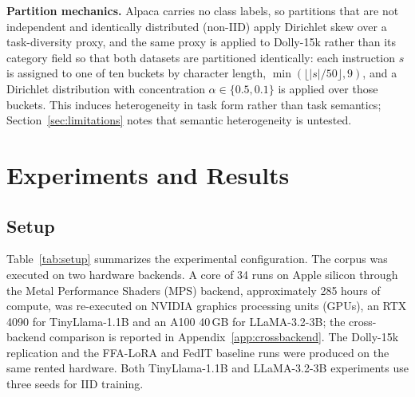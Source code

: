 \documentclass[iicol,pdflatex,sn-mathphys-num]{sn-jnl}
\begin{document}
\textbf{Partition mechanics.}
Alpaca carries no class labels, so partitions that are not independent and identically distributed (non-IID) apply Dirichlet skew over a task-diversity proxy, and the same proxy is applied to Dolly-15k rather than its category field so that both datasets are partitioned identically: each instruction $s$ is assigned to one of ten buckets by character length, $\min(\lfloor |s| / 50 \rfloor, 9)$, and a Dirichlet distribution with concentration $\alpha \in \{0.5, 0.1\}$ is applied over those buckets. This induces heterogeneity in task form rather than task semantics; Section~\ref{sec:limitations} notes that semantic heterogeneity is untested.

\section{Experiments and Results}
\label{sec:experiments}

\subsection{Setup}
\label{sec:setup}
Table~\ref{tab:setup} summarizes the experimental configuration. The corpus was executed on two hardware backends. A core of 34 runs on Apple silicon through the Metal Performance Shaders (MPS) backend, approximately 285 hours of compute, was re-executed on NVIDIA graphics processing units (GPUs), an RTX 4090 for TinyLlama-1.1B and an A100 40\,GB for LLaMA-3.2-3B; the cross-backend comparison is reported in Appendix~\ref{app:crossbackend}. The Dolly-15k replication and the FFA-LoRA and FedIT baseline runs were produced on the same rented hardware. Both TinyLlama-1.1B and LLaMA-3.2-3B experiments use three seeds for IID training.
\end{document}
